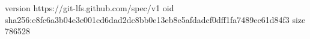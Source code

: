 version https://git-lfs.github.com/spec/v1
oid sha256:e8fc6a3b04e3e001cd6dad2dc8bb0e13eb8e5afdadcf0dff1fa7489ec61d84f3
size 786528
